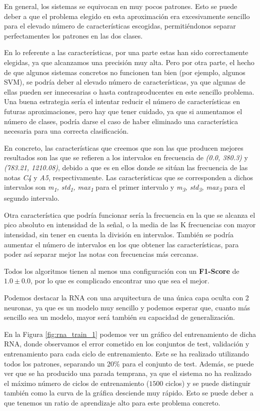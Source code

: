 \documentclass[12pt]{article}
\begin{document}
\bigskip
En general, los sistemas se equivocan en muy pocos patrones. Esto se puede deber a que el problema elegido en esta aproximación
era excesivamente sencillo para el elevado número de características escogidas, permitiéndonos separar perfectamentes los patrones
en las dos clases.

\bigskip
En lo referente a las características, por una parte estas han sido correctamente elegidas, ya que alcanzamos una precisión muy alta. Pero 
por otra parte, el hecho de que algunos sistemas concretos no 
funcionen tan bien (por ejemplo, algunos SVM), se podría deber al elevado número de características, 
ya que algunas de ellas pueden ser innecesarias o hasta contraproducentes en este sencillo problema. Una buena estrategia sería el intentar 
reducir el número de características en futuras aproximaciones, pero hay que tener cuidado, ya que si aumentamos el número de clases, 
podría darse el caso de haber eliminado una característica necesaria para una correcta clasificación.

En concreto, las características que creemos que son las que producen mejores resultados son las que se refieren a los intervalos 
en frecuencia de \textit{(0.0, 380.3)} y \textit{(783.21, 1210.08)}, debido a que es en ellos donde se sitúan las frecuencia de las notas 
\textit{C4} y \textit{A5}, respectivamente.
Las características que se corresponden a dichos intervalos son \textit{m\textsubscript{1}, std\textsubscript{1}, max\textsubscript{1}}
para el primer intervalo y \textit{m\textsubscript{3}, std\textsubscript{3}, max\textsubscript{3}} para el segundo intervalo.

Otra característica que podría funcionar sería la frecuencia en la que se alcanza el pico absoluto en intensidad de la señal,
o la media de las K frecuencias con mayor intensidad, sin tener en cuenta la división en intervalos. También se podría aumentar
el número de intervalos en los que obtener las características, para poder así separar mejor las notas con frecuencias más cercanas.

\bigskip
Todos los algoritmos tienen al menos una configuración con un \textbf{F1-Score} de $1.0 \pm 0.0$, por lo que es complicado encontrar uno que sea el mejor.

Podemos destacar la RNA con una arquitectura de una única capa oculta con 2 neuronas, ya que es un modelo muy sencillo y podemos esperar que, cuanto
más sencillo sea un modelo, mayor será también su capacidad de generalización. 

\bigskip
En la Figura \ref{fig:rna_train_1} podemos ver un gráfico del entrenamiento de dicha RNA, donde observamos el error
cometido en los conjuntos de test, validación y entrenamiento para cada ciclo de entrenamiento. Este se ha realizado
utilizando todos los patrones, separando un 20\% para el conjunto de test.
Además, se puede ver que se ha producido una parada temprana, ya que el sistema no ha realizado
el máximo número de ciclos de entrenamiento ($1500$ ciclos) y se puede distinguir también como la curva de la gráfica desciende muy rápido. 
Esto se puede deber a que tenemos un ratio de aprendizaje alto para este problema concreto.
\end{document}
